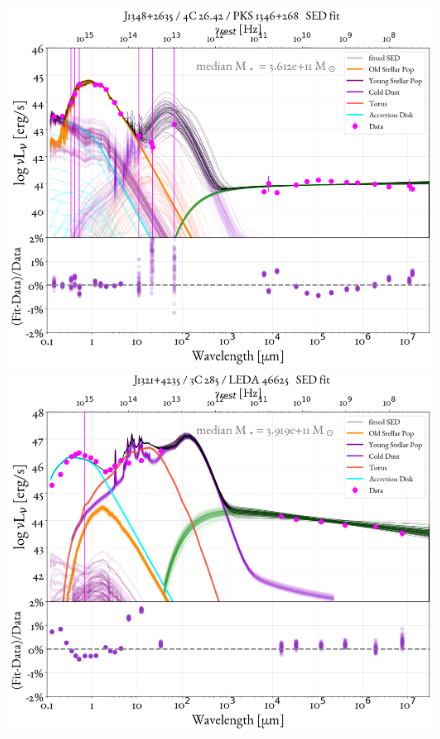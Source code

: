 \begin{figure}
    \centering
    \includegraphics[width=0.85\linewidth]{figures/ResultFits/103_SEDfit_5300.png}\\
    \includegraphics[width=0.85\linewidth]{figures/ResultFits/105_SEDfit_5306.png}   
\end{figure}
